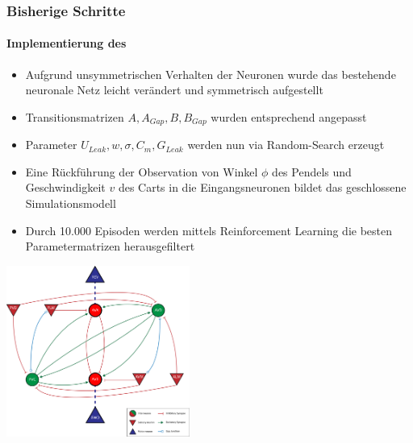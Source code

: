 \documentclass[10pt,t,aspectratio=1610]{beamer}
\begin{document}
\begin{frame}
  \frametitle{Bisherige Schritte}
  \framesubtitle{Implementierung des }
  
  \vspace{0.5cm}
  \begin{minipage}[c]{0.55\textwidth}
  \begin{itemize}
  	\item Aufgrund unsymmetrischen Verhalten der Neuronen wurde das bestehende neuronale Netz leicht verändert und symmetrisch aufgestellt
  	\item Transitionsmatrizen $A, A_{Gap}, B, B_{Gap}$ wurden entsprechend angepasst
  	\item Parameter $U_{Leak}, w, \sigma, C_m, G_{Leak}$ werden nun via Random-Search erzeugt
  	\item Eine Rückführung der Observation von Winkel $\phi$ des Pendels und Geschwindigkeit $v$ des Carts in die Eingangsneuronen bildet das geschlossene Simulationsmodell
  	\item Durch 10.000 Episoden werden mittels Reinforcement Learning die besten Parametermatrizen herausgefiltert
  \end{itemize}
  \end{minipage}
  \hfill
  \begin{minipage}[c]{0.4\textwidth}
  	\includegraphics[width=6cm]{figures/Neural_Net.png}
  \end{minipage}
  

\end{frame}

\end{document}

